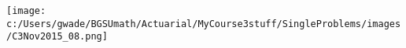 
\texttt{[image: c:/Users/gwade/BGSUmath/Actuarial/MyCourse3stuff/SingleProblems/images/C3Nov2015\_08.png]}

\showsol{\bsoln

 \esoln}
